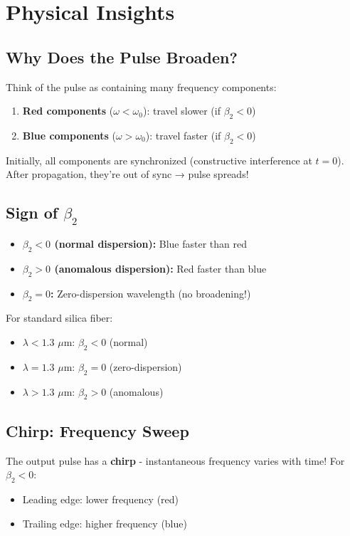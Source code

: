 \documentclass[12pt]{article}
\begin{document}
\section{Physical Insights}

\subsection{Why Does the Pulse Broaden?}

Think of the pulse as containing many frequency components:

\begin{enumerate}
\item \textbf{Red components} ($\omega < \omega_0$): travel slower (if $\beta_2 < 0$)
\item \textbf{Blue components} ($\omega > \omega_0$): travel faster (if $\beta_2 < 0$)
\end{enumerate}

Initially, all components are synchronized (constructive interference at $t=0$).
After propagation, they're out of sync → pulse spreads!

\subsection{Sign of $\beta_2$}

\begin{itemize}
\item \textbf{$\beta_2 < 0$ (normal dispersion):} Blue faster than red
\item \textbf{$\beta_2 > 0$ (anomalous dispersion):} Red faster than blue
\item \textbf{$\beta_2 = 0$:} Zero-dispersion wavelength (no broadening!)
\end{itemize}

For standard silica fiber:
\begin{itemize}
\item $\lambda < 1.3$ $\mu$m: $\beta_2 < 0$ (normal)
\item $\lambda = 1.3$ $\mu$m: $\beta_2 = 0$ (zero-dispersion)
\item $\lambda > 1.3$ $\mu$m: $\beta_2 > 0$ (anomalous)
\end{itemize}

\subsection{Chirp: Frequency Sweep}

The output pulse has a \textbf{chirp} - instantaneous frequency varies with time!
For $\beta_2 < 0$:
\begin{itemize}
\item Leading edge: lower frequency (red)
\item Trailing edge: higher frequency (blue)
\end{itemize}
\end{document}
